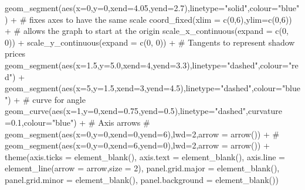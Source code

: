 \documentclass[
  letterpaper,
  DIV=11,
  numbers=noendperiod]{scrartcl}
\newenvironment{Shaded}{\begin{snugshade}}{\end{snugshade}}
\newcommand{\AttributeTok}[1]{\textcolor[rgb]{0.40,0.46,0.14}{#1}}
\newcommand{\CommentTok}[1]{\textcolor[rgb]{0.37,0.37,0.37}{#1}}
\newcommand{\DecValTok}[1]{\textcolor[rgb]{0.68,0.00,0.00}{#1}}
\newcommand{\FloatTok}[1]{\textcolor[rgb]{0.68,0.00,0.00}{#1}}
\newcommand{\FunctionTok}[1]{\textcolor[rgb]{0.28,0.35,0.67}{#1}}
\newcommand{\NormalTok}[1]{\textcolor[rgb]{0.00,0.46,0.62}{#1}}
\newcommand{\SpecialCharTok}[1]{\textcolor[rgb]{0.37,0.37,0.37}{#1}}
\newcommand{\StringTok}[1]{\textcolor[rgb]{0.13,0.47,0.30}{#1}}
\begin{document}
\begin{Shaded}
\begin{Highlighting}[]
  \FunctionTok{geom\_segment}\NormalTok{(}\FunctionTok{aes}\NormalTok{(}\AttributeTok{x=}\DecValTok{0}\NormalTok{,}\AttributeTok{y=}\DecValTok{0}\NormalTok{,}\AttributeTok{xend=}\FloatTok{4.05}\NormalTok{,}\AttributeTok{yend=}\FloatTok{2.7}\NormalTok{),}\AttributeTok{linetype=}\StringTok{"solid"}\NormalTok{,}\AttributeTok{colour=}\StringTok{"blue"}\NormalTok{) }\SpecialCharTok{+}
  \CommentTok{\# fixes axes to have the same scale}
  \FunctionTok{coord\_fixed}\NormalTok{(}\AttributeTok{xlim =} \FunctionTok{c}\NormalTok{(}\DecValTok{0}\NormalTok{,}\DecValTok{6}\NormalTok{),}\AttributeTok{ylim=}\FunctionTok{c}\NormalTok{(}\DecValTok{0}\NormalTok{,}\DecValTok{6}\NormalTok{)) }\SpecialCharTok{+} 
  \CommentTok{\# allows the graph to start at the origin}
  \FunctionTok{scale\_x\_continuous}\NormalTok{(}\AttributeTok{expand =} \FunctionTok{c}\NormalTok{(}\DecValTok{0}\NormalTok{, }\DecValTok{0}\NormalTok{)) }\SpecialCharTok{+} \FunctionTok{scale\_y\_continuous}\NormalTok{(}\AttributeTok{expand =} \FunctionTok{c}\NormalTok{(}\DecValTok{0}\NormalTok{, }\DecValTok{0}\NormalTok{)) }\SpecialCharTok{+}
  \CommentTok{\# Tangents to represent shadow prices}
  \FunctionTok{geom\_segment}\NormalTok{(}\FunctionTok{aes}\NormalTok{(}\AttributeTok{x=}\FloatTok{1.5}\NormalTok{,}\AttributeTok{y=}\FloatTok{5.0}\NormalTok{,}\AttributeTok{xend=}\DecValTok{4}\NormalTok{,}\AttributeTok{yend=}\FloatTok{3.3}\NormalTok{),}\AttributeTok{linetype=}\StringTok{"dashed"}\NormalTok{,}\AttributeTok{colour=}\StringTok{"red"}\NormalTok{) }\SpecialCharTok{+} 
  \FunctionTok{geom\_segment}\NormalTok{(}\FunctionTok{aes}\NormalTok{(}\AttributeTok{x=}\DecValTok{5}\NormalTok{,}\AttributeTok{y=}\FloatTok{1.5}\NormalTok{,}\AttributeTok{xend=}\DecValTok{3}\NormalTok{,}\AttributeTok{yend=}\FloatTok{4.5}\NormalTok{),}\AttributeTok{linetype=}\StringTok{"dashed"}\NormalTok{,}\AttributeTok{colour=}\StringTok{"blue"}\NormalTok{) }\SpecialCharTok{+}
  \CommentTok{\# curve for angle}
  \FunctionTok{geom\_curve}\NormalTok{(}\FunctionTok{aes}\NormalTok{(}\AttributeTok{x=}\DecValTok{1}\NormalTok{,}\AttributeTok{y=}\DecValTok{0}\NormalTok{,}\AttributeTok{xend=}\FloatTok{0.75}\NormalTok{,}\AttributeTok{yend=}\FloatTok{0.5}\NormalTok{),}\AttributeTok{linetype=}\StringTok{"dashed"}\NormalTok{,}\AttributeTok{curvature =}\FloatTok{0.1}\NormalTok{,}\AttributeTok{colour=}\StringTok{"blue"}\NormalTok{) }\SpecialCharTok{+}
  \CommentTok{\# Axis arrows}
  \CommentTok{\# geom\_segment(aes(x=0,y=0,xend=0,yend=6),lwd=2,arrow = arrow()) + }
  \CommentTok{\# geom\_segment(aes(x=0,y=0,xend=6,yend=0),lwd=2,arrow = arrow()) +}
  \FunctionTok{theme}\NormalTok{(}\AttributeTok{axis.ticks =} \FunctionTok{element\_blank}\NormalTok{(), }
        \AttributeTok{axis.text =} \FunctionTok{element\_blank}\NormalTok{(), }
        \AttributeTok{axis.line =} \FunctionTok{element\_line}\NormalTok{(}\AttributeTok{arrow =}\NormalTok{ arrow,}\AttributeTok{size =} \DecValTok{2}\NormalTok{),}
        \AttributeTok{panel.grid.major =} \FunctionTok{element\_blank}\NormalTok{(),}
        \AttributeTok{panel.grid.minor =} \FunctionTok{element\_blank}\NormalTok{(),}
        \AttributeTok{panel.background =} \FunctionTok{element\_blank}\NormalTok{())}
\end{Highlighting}
\end{Shaded}
\end{document}

